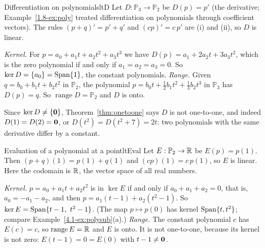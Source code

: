 \documentclass[11pt]{article}
\begin{document}
\begin{exmp}{Differentiation on polynomials}{ltD}
Let $D:\mathbb{P}_3\to\mathbb{P}_2$ be $D(p)=p'$ (the derivative; Example~\ref{1.8-ex:poly} treated differentiation on polynomials through coefficient vectors). The rules $(p+q)'=p'+q'$ and $(cp)'=c\,p'$ are (i) and (ii), so $D$ is linear.

\emph{Kernel.} For $p=a_0+a_1t+a_2t^2+a_3t^3$ we have $D(p)=a_1+2a_2t+3a_3t^2$, which is the zero polynomial if and only if $a_1=a_2=a_3=0$. So $\ker D=\{a_0\}=\operatorname{Span}\{1\}$, the constant polynomials. \emph{Range.} Given $q=b_0+b_1t+b_2t^2$ in $\mathbb{P}_2$, the polynomial $p=b_0t+\tfrac12b_1t^2+\tfrac13b_2t^3$ in $\mathbb{P}_3$ has $D(p)=q$. So $\operatorname{range}D=\mathbb{P}_2$ and $D$ is onto.

Since $\ker D\neq\{\mathbf{0}\}$, Theorem~\ref{thm:onetoone} says $D$ is not one-to-one, and indeed $D(1)=D(2)=\mathbf{0}$, or $D(t^2)=D(t^2+7)=2t$: two polynomials with the same derivative differ by a constant.
\end{exmp}

\begin{exmp}{Evaluation of a polynomial at a point}{ltEval}
Let $E:\mathbb{P}_2\to\mathbb{R}$ be $E(p)=p(1)$. Then $(p+q)(1)=p(1)+q(1)$ and $(cp)(1)=c\,p(1)$, so $E$ is linear. Here the codomain is $\mathbb{R}$, the vector space of all real numbers.

\emph{Kernel.} $p=a_0+a_1t+a_2t^2$ is in $\ker E$ if and only if $a_0+a_1+a_2=0$, that is, $a_0=-a_1-a_2$, and then $p=a_1(t-1)+a_2(t^2-1)$. So $\ker E=\operatorname{Span}\{t-1,\ t^2-1\}$. (The map $p\mapsto p(0)$ has kernel $\operatorname{Span}\{t,t^2\}$; compare Example~\ref{4.1-ex:polysub}(a).) \emph{Range.} The constant polynomial $c$ has $E(c)=c$, so $\operatorname{range}E=\mathbb{R}$ and $E$ is onto. It is not one-to-one, because its kernel is not zero: $E(t-1)=0=E(0)$ with $t-1\neq\mathbf{0}$.
\end{exmp}
\end{document}
